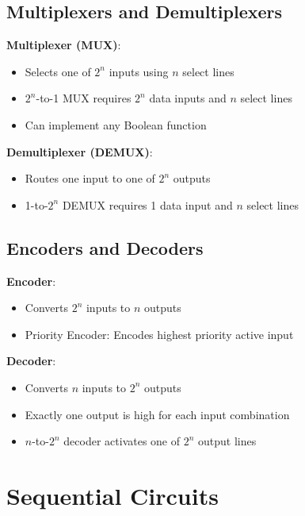\documentclass[12pt,a4paper]{report}
\begin{document}
\subsection{Multiplexers and Demultiplexers}
\begin{concept}
\textbf{Multiplexer (MUX)}:
\begin{itemize}
    \item Selects one of $2^n$ inputs using $n$ select lines
    \item $2^n$-to-1 MUX requires $2^n$ data inputs and $n$ select lines
    \item Can implement any Boolean function
\end{itemize}

\textbf{Demultiplexer (DEMUX)}:
\begin{itemize}
    \item Routes one input to one of $2^n$ outputs
    \item 1-to-$2^n$ DEMUX requires 1 data input and $n$ select lines
\end{itemize}
\end{concept}

\subsection{Encoders and Decoders}
\begin{concept}
\textbf{Encoder}:
\begin{itemize}
    \item Converts $2^n$ inputs to $n$ outputs
    \item Priority Encoder: Encodes highest priority active input
\end{itemize}

\textbf{Decoder}:
\begin{itemize}
    \item Converts $n$ inputs to $2^n$ outputs
    \item Exactly one output is high for each input combination
    \item $n$-to-$2^n$ decoder activates one of $2^n$ output lines
\end{itemize}
\end{concept}

\section{Sequential Circuits}
\end{document}
